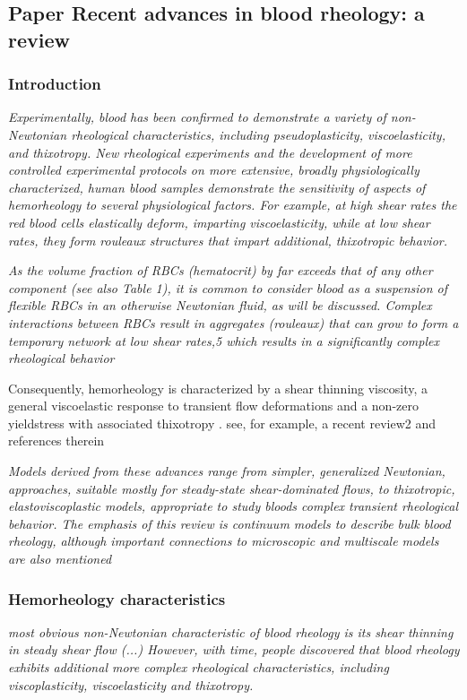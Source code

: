 \documentclass[11pt,letterpaper]{article}
\begin{document}
\newpage
\subsection{Paper Recent advances in blood rheology: a review}

\subsubsection*{Introduction}
\textit{Experimentally, blood has been confirmed to demonstrate a variety of non-Newtonian rheological characteristics, including pseudoplasticity, viscoelasticity, and thixotropy. New rheological experiments and the development of more controlled experimental protocols on more extensive, broadly physiologically characterized, human blood samples demonstrate the sensitivity of aspects of hemorheology to several physiological factors. For example, at high shear rates the red blood cells elastically deform, imparting viscoelasticity, while at low shear rates, they form rouleaux structures that impart additional, thixotropic behavior.}

\textit{As the volume fraction of RBCs (hematocrit) by far exceeds that of any other component (see also Table 1), it is common to consider blood as a suspension of flexible RBCs in an otherwise Newtonian fluid, as will be discussed. Complex interactions between RBCs result in aggregates (rouleaux) that can grow to form a temporary network at low shear rates,5 which results in a significantly complex rheological behavior}


{\color{red} Consequently, hemorheology is characterized by a shear thinning viscosity, a general viscoelastic response to transient flow deformations and a non-zero yieldstress with associated
thixotropy . see, for example, a recent review2 and references therein}


\textit{Models derived from these advances range from simpler, generalized Newtonian, approaches, suitable mostly for steady-state shear-dominated flows, to thixotropic, elastoviscoplastic models, appropriate to study bloods complex transient rheological behavior. The emphasis of this review is continuum models to describe bulk blood rheology, although important connections to microscopic and multiscale models are also mentioned}

\subsubsection*{Hemorheology characteristics}
\textit{most obvious non-Newtonian characteristic of blood rheology is its shear thinning in steady shear flow (...) However, with time, people discovered that blood rheology exhibits additional more complex rheological characteristics, including viscoplasticity, viscoelasticity and thixotropy. }
\end{document}
